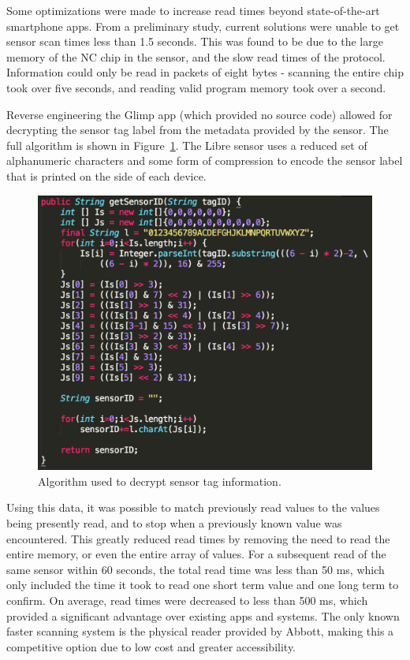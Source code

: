 Some optimizations were made to increase read times beyond state-of-the-art smartphone apps. From a preliminary study, current solutions were unable to get sensor scan times less than 1.5 seconds. This was found to be due to the large memory of the NC chip in the sensor, and the slow read times of the protocol. Information could only be read in packets of eight bytes - scanning the entire chip took over five seconds, and reading valid program memory took over a second.

Reverse engineering the Glimp app (which provided no source code) allowed for decrypting the sensor tag label from the metadata provided by the sensor. The full algorithm is shown in Figure~\ref{fig:sensortagalgo}. The Libre sensor uses a reduced set of alphanumeric characters and some form of compression to encode the sensor label that is printed on the side of each device.

\begin{figure}[ht]
\centering\includegraphics[width=0.75\linewidth]{images/sensortagalgo.png}
\caption{Algorithm used to decrypt sensor tag information.}
\label{fig:sensortagalgo}
\end{figure}

Using this data, it was possible to match previously read values to the values being presently read, and to stop when a previously known value was encountered. This greatly reduced read times by removing the need to read the entire memory, or even the entire array of values. For a subsequent read of the same sensor within 60 seconds, the total read time was less than 50 ms, which only included the time it took to read one short term value and one long term to confirm. On average, read times were decreased to less than 500 ms, which provided a significant advantage over existing apps and systems. The only known faster scanning system is the physical reader provided by Abbott, making this a competitive option due to low cost and greater accessibility.

